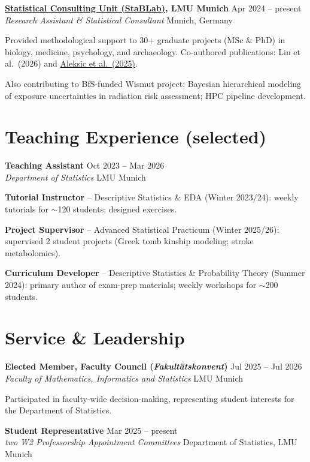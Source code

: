 \documentclass[a4paper,11pt]{article}
\newcommand{\entry}[4]{%
  \textbf{#1} \hfill #2\\
  \textit{#3} \hfill #4\par
}
\newenvironment{details}{%
  \begin{list}{}{%
    \setlength{\leftmargin}{1.5em}%
    \setlength{\rightmargin}{0pt}%
    \setlength{\topsep}{0.1em}%
    \setlength{\parsep}{0.2em}%
    \setlength{\itemsep}{0pt}%
  }%
  \item[]%
}{%
  \end{list}%
}
\begin{document}
\entry{\href{https://www.stat.lmu.de/stablab/de/}{Statistical Consulting Unit (StaBLab)}, LMU Munich}{Apr 2024 -- present}
      {Research Assistant \& Statistical Consultant}{Munich, Germany} 
\begin{details}
Provided methodological support to 30+ graduate projects (MSc \& PhD) in biology, medicine, psychology, and archaeology. Co-authored publications: Lin et al.\ (2026) and \href{https://doi.org/10.31219/osf.io/9hmdb_v2}{Aleksic et al.\ (2025)}.

Also contributing to BfS-funded Wismut project: Bayesian hierarchical modeling of exposure uncertainties in radiation risk assessment; HPC pipeline development.
\end{details}

\section*{Teaching Experience (selected)}

\entry{Teaching Assistant}{Oct 2023 -- Mar 2026}
      {Department of Statistics}{LMU Munich}
\begin{details}
\textbf{Tutorial Instructor} -- Descriptive Statistics \& EDA (Winter 2023/24): weekly tutorials for $\sim$120 students; designed exercises.

\textbf{Project Supervisor} -- Advanced Statistical Practicum (Winter 2025/26): supervised 2 student projects (Greek tomb kinship modeling; stroke metabolomics).

\textbf{Curriculum Developer} -- Descriptive Statistics \& Probability Theory (Summer 2024): primary author of exam-prep materials; weekly workshops for $\sim$200 students.
\end{details}
\section*{Service \& Leadership}

\entry{Elected Member, Faculty Council (\textit{Fakultätskonvent})}{Jul 2025 -- Jul 2026}
      {Faculty of Mathematics, Informatics and Statistics}{LMU Munich}
\begin{details}
Participated in faculty-wide decision-making, representing student interests for the Department of Statistics.
\end{details}
\entry{Student Representative}{Mar 2025 -- present}
      {two W2 Professorship Appointment Committees}{Department of Statistics, LMU Munich}
\end{document}
